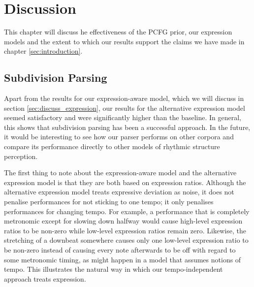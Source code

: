 \chapter{Discussion}
\label{sec:discussion}



This chapter will discuss he effectiveness of the PCFG prior, our expression models and the extent to which our results support the claims we have made in chapter \ref{sec:introduction}.

\section{Subdivision Parsing}

Apart from the results for our expression-aware model, which we will discuss in section \ref{sec:discuss_expression}, our results for the alternative expression model seemed satisfactory and were significantly higher than the baseline. In general, this shows that subdivision parsing has been a successful approach. In the future, it would be interesting to see how our parser performs on other corpora and compare its performance directly to other models of rhythmic structure perception.

The first thing to note about the expression-aware model and the alternative expression model is that they are both based on expression ratios. Although the alternative expression model treats expressive deviation as noise, it does not penalise performances for not sticking to one tempo; it only penalises performances for changing tempo. For example, a performance that is completely metronomic except for slowing down halfway would cause high-level expression ratios to be non-zero while low-level expression ratios remain zero. Likewise, the stretching of a downbeat somewhere causes only one low-level expression ratio to be non-zero instead of causing every note afterwards to be off with regard to some metronomic timing, as might happen in a model that assumes notions of tempo. This illustrates the natural way in which our tempo-independent approach treats expression.

